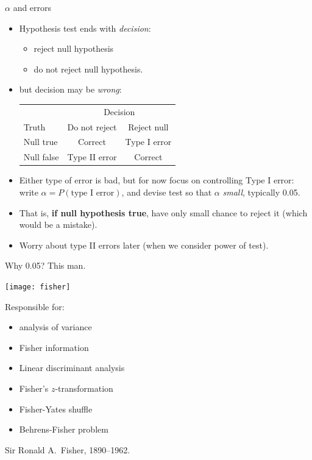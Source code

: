 \documentclass[unknownkeysallowed]{beamer}\usepackage[]{graphicx}\usepackage[]{color}
\begin{document}
\begin{frame}[fragile]{$\alpha$ and errors}
  
  \begin{itemize}
  \item Hypothesis test ends with \emph{decision}:
    \begin{itemize}
    \item reject null hypothesis
    \item do not reject null hypothesis.
    \end{itemize}
  \item but decision may be \emph{wrong}:
    

\begin{center}
  
  
\begin{tabular}{|l|cc|}
\hline
  & \multicolumn{2}{c|}{Decision}\\
Truth & Do not reject & Reject null\\
\hline
Null true & Correct & Type I error\\
Null false & Type II error & Correct\\
\hline
\end{tabular}
\end{center}

\item Either type of error is bad, but for now focus on controlling
  Type I error: write $\alpha=P(\mbox{type I error})$, and devise test
  so that $\alpha$ \emph{small}, typically 0.05.
\item That is, \textbf{if null hypothesis true}, have only small
  chance to reject it (which would be a mistake).
\item Worry about type II errors later (when we consider power of
  test). 

  \end{itemize}
  
\end{frame}

\begin{frame}[fragile]{Why 0.05? This man.}
  
  \begin{multicols}{2}
  
  \texttt{[image: fisher]}
  
  Responsible for:
  
  \begin{itemize}
  \item analysis of variance
  \item Fisher information
  \item Linear discriminant analysis
  \item Fisher's $z$-transformation
  \item Fisher-Yates shuffle
  \item Behrens-Fisher problem
  \end{itemize}

  Sir Ronald A.\ Fisher, 1890--1962.
  \end{multicols}
  
\end{frame}
\end{document}
